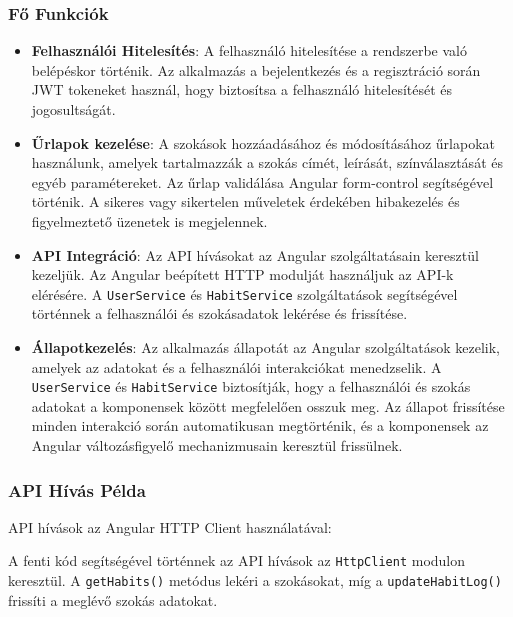 \documentclass[12pt]{report}
\begin{document}
\subsubsection{Fő Funkciók}
\begin{itemize}
  \item \textbf{Felhasználói Hitelesítés}: A felhasználó hitelesítése a rendszerbe való belépéskor történik. Az alkalmazás a bejelentkezés és a regisztráció során JWT tokeneket használ, hogy biztosítsa a felhasználó hitelesítését és jogosultságát.
  \item \textbf{Űrlapok kezelése}: A szokások hozzáadásához és módosításához űrlapokat használunk, amelyek tartalmazzák a szokás címét, leírását, színválasztását és egyéb paramétereket. Az űrlap validálása Angular form-control segítségével történik. A sikeres vagy sikertelen műveletek érdekében hibakezelés és figyelmeztető üzenetek is megjelennek.
  \item \textbf{API Integráció}: Az API hívásokat az Angular szolgáltatásain keresztül kezeljük. Az Angular beépített HTTP modulját használjuk az API-k elérésére. A \texttt{UserService} és \texttt{HabitService} szolgáltatások segítségével történnek a felhasználói és szokásadatok lekérése és frissítése.
  \item \textbf{Állapotkezelés}: Az alkalmazás állapotát az Angular szolgáltatások kezelik, amelyek az adatokat és a felhasználói interakciókat menedzselik. A \texttt{UserService} és \texttt{HabitService} biztosítják, hogy a felhasználói és szokás adatokat a komponensek között megfelelően osszuk meg. Az állapot frissítése minden interakció során automatikusan megtörténik, és a komponensek az Angular változásfigyelő mechanizmusain keresztül frissülnek.
\end{itemize}

\subsubsection{API Hívás Példa}

API hívások az Angular HTTP Client használatával:




A fenti kód segítségével történnek az API hívások az \texttt{HttpClient} modulon keresztül. A \texttt{getHabits()} metódus lekéri a szokásokat, míg a \texttt{updateHabitLog()} frissíti a meglévő szokás adatokat.
\end{document}
